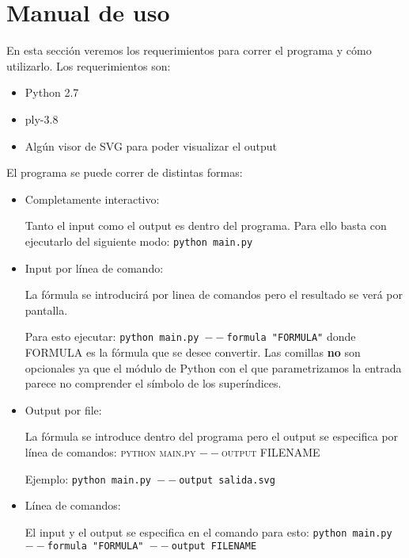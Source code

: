 \section{Manual de uso}
En esta secci\'on veremos los requerimientos para correr el programa y c\'omo utilizarlo. Los requerimientos son:

\begin{itemize}
  \item Python 2.7
  \item ply-3.8
  \item Alg\'un visor de SVG para poder visualizar el output
\end{itemize}

El programa se puede correr de distintas formas:

\begin{itemize}
  \item {
  	\par Completamente interactivo:
  	\par Tanto el input como el output es dentro del programa. Para ello basta con ejecutarlo del siguiente modo: \texttt{python main.py}
  	}
  \item {
  	\par Input por l\'inea de comando:
  	\par La f\'ormula se introducir\'a por linea de comandos pero el resultado se ver\'a por pantalla.
  	\par Para esto ejecutar: \texttt{python main.py $--$formula "FORMULA"} donde FORMULA es la f\'ormula que se desee convertir. Las comillas \textbf{no} son opcionales ya que el m\'odulo de Python con el que parametrizamos la entrada parece no comprender el s\'imbolo de los super\'indices.
  }
  \item {
  	\par Output por file: 
  	\par La f\'ormula se introduce dentro del programa pero el output se especifica por l\'inea de comandos: \textsc{python main.py $--$output FILENAME} 
  	\par Ejemplo: \texttt{python main.py $--$output salida.svg}
  }
  \item {
  	\par L\'inea de comandos: 
  	\par El input y el output se especifica en el comando para esto: \texttt{python main.py $--$formula "FORMULA" $--$output FILENAME}
  }
\end{itemize}
